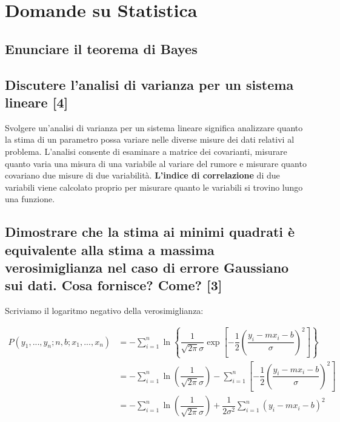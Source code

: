 \documentclass[\main/main.tex]{subfiles}
\begin{document}
\section{Domande su Statistica}





\subsection{Enunciare il teorema di Bayes}
\bayesTh

\subsection{Discutere l'analisi di varianza per un sistema lineare [4]}
Svolgere un'analisi di varianza per un sistema lineare significa analizzare quanto la stima di un parametro possa variare nelle diverse misure dei dati relativi al problema.
L'analisi consente di esaminare a matrice dei covarianti, misurare quanto varia una misura di una variabile al variare del rumore e misurare quanto covariano due misure di due variabilità.
\textbf{L'indice di correlazione} di due variabili viene calcolato proprio per misurare quanto le variabili si trovino lungo una funzione.

\subsection{Dimostrare che la stima ai minimi quadrati è equivalente alla stima a massima verosimiglianza nel caso di errore Gaussiano sui dati. Cosa fornisce? Come? [3]}
Scriviamo il logaritmo negativo della verosimiglianza:

\begin{align}
	P \left(y_1,...,y_n; n, b; x_1, ..., x_n \right) & =
	- \sum_{i=1}^n
	\ln \left\{
	\dfrac{1}{\sqrt{2\pi}\sigma}
	\exp \left[
		-\dfrac{1}{2}	\left(\dfrac{ y_i - mx_i - b}{\sigma} \right)^2
		\right]
	\right\}                                             \\
	                                                 & =
	- \sum_{i=1}^n \ln
	\left ( \dfrac{1}{\sqrt{2\pi}\sigma} \right )
	- \sum_{i=1}^n
	\left[
		-\dfrac{1}{2}	\left(\dfrac{ y_i - mx_i - b}{\sigma} \right)^2
		\right]                                              \\
	                                                 & =
	- \sum_{i=1}^n \ln
	\left ( \dfrac{1}{\sqrt{2\pi}\sigma} \right )
	+ \dfrac{1}{2\sigma^2} \sum_{i=1}^n
	\left(y_i - mx_i - b \right)^2
\end{align}
\end{document}
